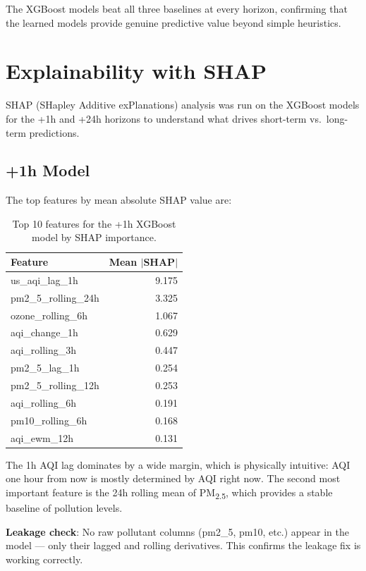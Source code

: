 \documentclass[12pt, a4paper]{article}
\begin{document}
The XGBoost models beat all three baselines at every horizon, confirming that the learned models provide genuine predictive value beyond simple heuristics.


\section{Explainability with SHAP}

SHAP (SHapley Additive exPlanations) analysis was run on the XGBoost models for the +1h and +24h horizons to understand what drives short-term vs.\ long-term predictions.

\subsection{+1h Model}

The top features by mean absolute SHAP value are:

\begin{table}[H]
\centering
\caption{Top 10 features for the +1h XGBoost model by SHAP importance.}
\begin{tabular}{lr}
\toprule
\textbf{Feature} & \textbf{Mean $|$SHAP$|$} \\
\midrule
us\_aqi\_lag\_1h       & 9.175 \\
pm2\_5\_rolling\_24h   & 3.325 \\
ozone\_rolling\_6h     & 1.067 \\
aqi\_change\_1h        & 0.629 \\
aqi\_rolling\_3h       & 0.447 \\
pm2\_5\_lag\_1h         & 0.254 \\
pm2\_5\_rolling\_12h   & 0.253 \\
aqi\_rolling\_6h       & 0.191 \\
pm10\_rolling\_6h      & 0.168 \\
aqi\_ewm\_12h          & 0.131 \\
\bottomrule
\end{tabular}
\end{table}

The 1h AQI lag dominates by a wide margin, which is physically intuitive: AQI one hour from now is mostly determined by AQI right now.  The second most important feature is the 24h rolling mean of PM\textsubscript{2.5}, which provides a stable baseline of pollution levels.

\textbf{Leakage check}: No raw pollutant columns (pm2\_5, pm10, etc.) appear in the model --- only their lagged and rolling derivatives.  This confirms the leakage fix is working correctly.
\end{document}
